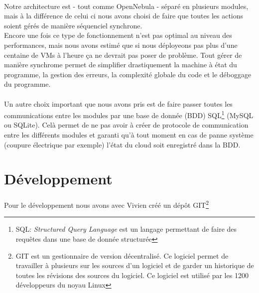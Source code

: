 \paragraph*{}
Notre architecture est - tout comme OpenNebula - séparé en plusieurs modules, mais à la différence de celui ci nous avons choisi de faire que toutes les actions soient gérés
de manière séquenciel synchrone.\\ %
Encore une fois ce type de fonctionnement n'est pas optimal au niveau des performances, mais nous avons estimé que si nous déployeons pas plus d'une centaine de VMs à
l'heure ça ne devrait pas poser de problème.
Tout gérer de manière synchrome permet de simplifier drastiquement la machine à état du programme, la gestion des erreurs, la complexité globale du code et le déboggage
du programme.

\paragraph*{}
Un autre choix important que nous avons pris est de faire passer toutes les communications entre les modules par une base de donnée (BDD)
SQL\footnote{SQL: \emph{Structured Query Language} est un langage permettant de faire des requêtes dans une base de donnée structurée} (MySQL ou SQLite).
Celà permet de ne pas avoir à créer de protocole de communication entre les différents modules et garanti qu'à tout moment en cas de panne système (coupure électrique
par exemple) l'état du cloud soit enregistré dans la BDD.

\section{Développement}

\paragraph*{}
Pour le développement nous avons avec Vivien créé un dépôt GIT\footnote{GIT est un gestionnaire de version décentralisé. Ce logiciel permet de travailler à plusieurs
sur les sources d'un logiciel et de garder un historique de toutes les révisions des sources du logiciel. Ce logiciel est utilisé par les 1200 développeurs du noyau Linux}

